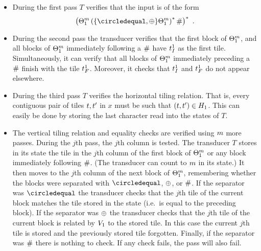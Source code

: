 \begin{itemize}
\item
    During the first pass $T$ verifies that the input is of the form
    \[
        \brac{
            \tilesnum{1}^\linlen
            \brac{\set{\numeq,\numplus} \tilesnum{1}^\linlen}^\ast
            \numsep
        }^\ast \ .
    \]

\item
    During the second pass the transducer verifies that the first block of
    $\Theta_{1}^m$,
    and all blocks of
    $\Theta_{1}^m$
    immediately following a $\#$ have $t_I^{1}$ as the first tile.
    Simultaneously, it can verify that all blocks of
    $\Theta_{1}^m$
    immediately preceding a $\#$ finish with the tile $t_F^{1}$.
    Moreover, it checks that $t_I^{1}$ and $t_F^{1}$ do not appear elsewhere.

\item
    During the third pass $T$ verifies the horizontal tiling relation.
    That is, every contiguous pair of tiles $t, t'$ in $x$ must be such that
    $(t, t') \in H_{1}$.
    This can easily be done by storing the last character read into the states of $T$.

\item
    The vertical tiling relation and equality checks are verified using $m$ more passes.
    During the $j$th pass, the $j$th column is tested.
    The transducer $T$ stores in its state the tile in the $j$th column of the first block of $\Theta_{1}^m$ or any block immediately following $\#$.
    (The transducer can count to $m$ in its state.)
    It then moves to the $j$th column of the next block of $\Theta_{1}^m$, remembering whether the blocks were separated with $\numeq$, $\oplus$, or $\#$.
    If the separator was $\numeq$ the transducer checks that the $j$th tile of the current block matches the tile stored in the state (i.e.~is equal to the preceding block).
    If the separator was $\oplus$ the transducer checks that the $j$th tile of the current block is related by $V_{1}$ to the stored tile.
    In this case the current $j$th tile is stored and the previously stored tile forgotten.
    Finally, if the separator was $\#$ there is nothing to check.
    If any check fails, the pass will also fail.
\end{itemize}

